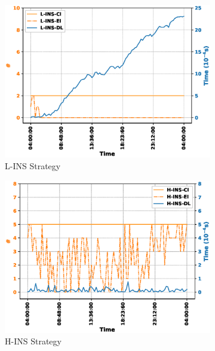 \documentclass[conference, final]{IEEEtran}
\begin{document}
{\begin{figure}
\begin{subfigure}[h]{0.32\linewidth}
\includegraphics[width=\linewidth]{./figures/L-INSinstance_trace.eps}
\caption{{\textsf{L-INS}} Strategy}
\end{subfigure}
\hfill
\begin{subfigure}[h]{0.32\linewidth}
\includegraphics[width=\linewidth]{./figures/H-INSinstance_trace.eps}
\caption{{\textsf{H-INS}} Strategy}
\end{subfigure}
\hfill
\begin{subfigure}[h]{0.32\linewidth}

\end{subfigure}
\end{figure}}
\end{document}
